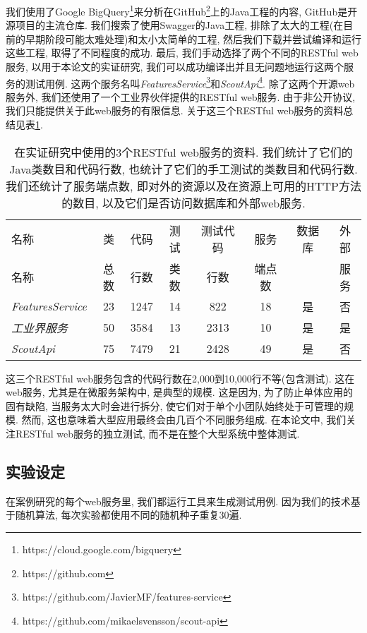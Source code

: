         我们使用了Google BigQuery\footnote{https://cloud.google.com/bigquery}来分析在GitHub\footnote{https://github.com}上的Java工程的内容, GitHub是开源项目的主流仓库. 我们搜索了使用Swagger的Java工程, 排除了太大的工程(在目前的早期阶段可能太难处理)和太小太简单的工程, 然后我们下载并尝试编译和运行这些工程, 取得了不同程度的成功. 最后, 我们手动选择了两个不同的RESTful web服务, 以用于本论文的实证研究, 我们可以成功编译出并且无问题地运行这两个服务的测试用例. 这两个服务名叫\textit{FeaturesService}\footnote{https://github.com/JavierMF/features-service}和\textit{ScoutApi}\footnote{https://github.com/mikaelsvensson/scout-api}. 除了这两个开源web服务外, 我们还使用了一个工业界伙伴提供的RESTful web服务. 由于非公开协议, 我们只能提供关于此web服务的有限信息. 关于这三个RESTful web服务的资料总结见表\ref{table1}. 
        
  \begin{table}
      \small
      \centering
      \begin{tabular}{lccccccc}
          \toprule
            名称 & 类 & 代码 & 测试 & 测试代码 & 服务 & 数据库 & 外部 \\
            名称 & 总数 & 行数 & 类数 & 行数 & 端点数 &  & 服务 \\
            \midrule
            \textit{FeaturesService} & 23 & 1247 & 14 & 822 & 18 & 是 & 否 \\
            \textit{工业界服务} & 50 & 3584 & 13 & 2313 & 10 & 是 & 是 \\
            \textit{ScoutApi} & 75 & 7479 & 21 & 2428 & 49 & 是 & 否 \\
            \bottomrule
        \end{tabular}
        \caption[]{在实证研究中使用的3个RESTful web服务的资料. 我们统计了它们的Java类数目和代码行数, 也统计了它们的手工测试的类数目和代码行数. 我们还统计了服务端点数, 即对外的资源以及在资源上可用的HTTP方法的数目, 以及它们是否访问数据库和外部web服务.}
        \label{table1}
    \end{table}

        这三个RESTful web服务包含的代码行数在2,000到10,000行不等(包含测试). 这在web服务, 尤其是在微服务架构中, 是典型的规模. 这是因为, 为了防止单体应用的固有缺陷, 当服务太大时会进行拆分, 使它们对于单个小团队始终处于可管理的规模. 然而, 这也意味着大型应用最终会由几百个不同服务组成. 在本论文中, 我们关注RESTful web服务的独立测试, 而不是在整个大型系统中整体测试. 
    
    \subsection{实验设定}
      在案例研究的每个web服务里, 我们都运行工具来生成测试用例. 因为我们的技术基于随机算法, 每次实验都使用不同的随机种子重复30遍. 
        
